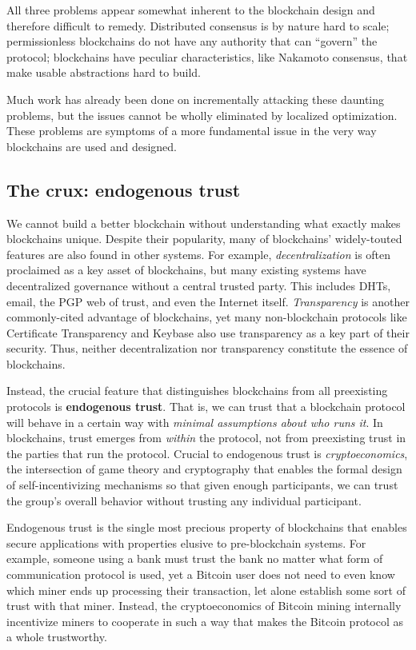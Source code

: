 \documentclass[headinclude,12pt]{scrbook}
\begin{document}
All three problems appear somewhat inherent to the blockchain design and therefore difficult to remedy. Distributed consensus is by nature hard to scale; permissionless blockchains do not have any authority that can ``govern'' the protocol; blockchains have peculiar characteristics, like Nakamoto consensus, that make usable abstractions hard to build.

Much work has already been done on incrementally attacking these daunting problems, but the issues cannot be wholly eliminated by localized optimization. These problems are symptoms of a more fundamental issue in the very way blockchains are used and designed.


\subsection{The crux: endogenous trust}


We cannot build a better blockchain without understanding what exactly makes blockchains unique. Despite their popularity, many of block\-chains' widely-touted features are also found in other systems. For example, \emph{decentralization} is often proclaimed as a key asset of blockchains, but many existing systems have decentralized governance without a central trusted party. This includes DHTs, email, the PGP web of trust, and even the Internet itself. \emph{Transparency} is another commonly-cited advantage of blockchains, yet many non-blockchain protocols like Certificate Transparency and Keybase also use transparency as a key part of their security. Thus, neither decentralization nor transparency constitute the essence of blockchains.

Instead, the crucial feature that distinguishes blockchains from all preexisting protocols is \textbf{endogenous trust}. That is, we can trust that a blockchain protocol will behave in a certain way with \emph{minimal assumptions about who runs it}. In blockchains, trust emerges from \emph{within} the protocol, not from preexisting trust in the parties that run the protocol. Crucial to endogenous trust is \emph{cryptoeconomics}, the intersection of game theory and cryptography that enables the formal design of self-incentivizing mechanisms so that given enough participants, we can trust the group's overall behavior without trusting any individual participant.

Endogenous trust is the single most precious property of blockchains that enables secure applications with properties elusive to pre-blockchain systems. For example, someone using a bank must trust the bank no matter what form of communication protocol is used, yet a Bitcoin user does not need to even know which miner ends up processing their transaction, let alone establish some sort of trust with that miner. Instead, the cryptoeconomics of Bitcoin mining internally incentivize miners to cooperate in such a way that makes the Bitcoin protocol as a whole trustworthy.
\end{document}
